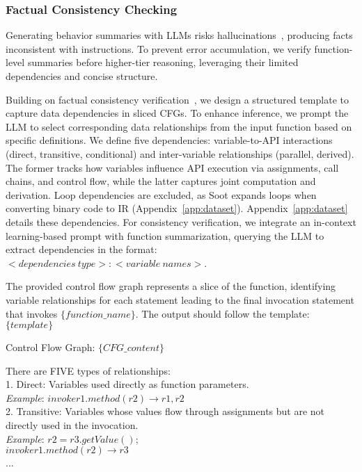 \subsubsection{Factual Consistency Checking}
Generating behavior summaries with LLMs risks hallucinations~\cite{nature24hallucinations}, producing facts inconsistent with instructions. To prevent error accumulation, we verify function-level summaries before higher-tier reasoning, leveraging their limited dependencies and concise structure.

Building on factual consistency verification~\cite{cloze, factasking}, we design a structured template to capture data dependencies in sliced CFGs. To enhance inference, we prompt the LLM to select corresponding data relationships from the input function based on specific definitions. We define five dependencies: variable-to-API interactions (direct, transitive, conditional) and inter-variable relationships (parallel, derived). The former tracks how variables influence API execution via assignments, call chains, and control flow, while the latter captures joint computation and derivation. Loop dependencies are excluded, as Soot expands loops when converting binary code to IR (Appendix~\ref{app:dataset}). Appendix~\ref{app:dataset} details these dependencies. For consistency verification, we integrate an in-context learning-based prompt with function summarization, querying the LLM to extract dependencies in the format: $<dependencies\ type>:<variable\ names>$.


\begin{tcolorbox}[title=Factual Consistency Verification Prompt, colback=gray!20, colframe=black, colbacktitle=black, coltitle=white, sharp corners, fontupper=\small, fontlower=\small, before upper=\raggedright, before lower=\raggedright]
The provided control flow graph represents a slice of the function, identifying variable relationships for each statement leading to the final invocation statement that invokes $\{function\_name\}$. The output should follow the template: $\{template\}$

Control Flow Graph: $\{CFG\_content\}$ 

There are FIVE types of relationships: \\
1. Direct: Variables used directly as function parameters.\\
\textit{Example}: $invoke r1.method(r2) \rightarrow {r1, r2}$ \\
2. Transitive: Variables whose values flow through assignments but are not directly used in the invocation. \\
\textit{Example}: $r2 = r3.getValue()$; \\
$invoke r1.method(r2) \rightarrow {r3}$ \\
...
\end{tcolorbox}

